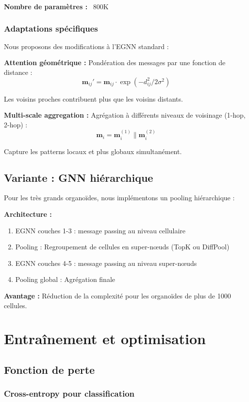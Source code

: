 \textbf{Nombre de paramètres :} ~800K

\subsubsection{Adaptations spécifiques}

Nous proposons des modifications à l'EGNN standard :

\textbf{Attention géométrique :}
Pondération des messages par une fonction de distance :
\[
\mathbf{m}_{ij}' = \mathbf{m}_{ij} \cdot \exp(-d_{ij}^2 / 2\sigma^2)
\]

Les voisins proches contribuent plus que les voisins distants.

\textbf{Multi-scale aggregation :}
Agrégation à différents niveaux de voisinage (1-hop, 2-hop) :
\[
\mathbf{m}_i = \mathbf{m}_i^{(1)} \| \mathbf{m}_i^{(2)}
\]

Capture les patterns locaux et plus globaux simultanément.

\subsection{Variante : GNN hiérarchique}

Pour les très grands organoïdes, nous implémentons un pooling hiérarchique :

\textbf{Architecture :}
\begin{enumerate}
    \item EGNN couches 1-3 : message passing au niveau cellulaire
    \item Pooling : Regroupement de cellules en super-nœuds (TopK ou DiffPool)
    \item EGNN couches 4-5 : message passing au niveau super-nœuds
    \item Pooling global : Agrégation finale
\end{enumerate}

\textbf{Avantage :} Réduction de la complexité pour les organoïdes de plus de 1000 cellules.

\section{Entraînement et optimisation}

\subsection{Fonction de perte}

\subsubsection{Cross-entropy pour classification}

